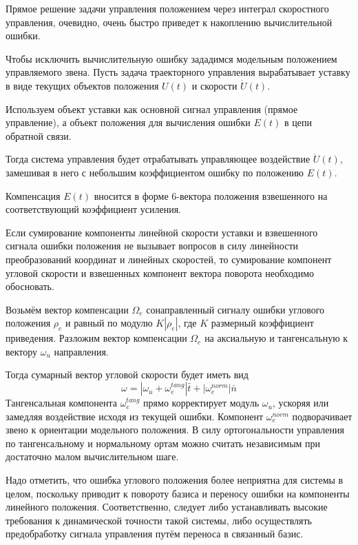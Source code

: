 Прямое решение задачи управления положением через интеграл скоростного управления, очевидно, очень быстро приведет к накоплению вычислительной ошибки.

Чтобы исключить вычислительную ошибку зададимся модельным положением управляемого звена. Пусть задача траекторного управления вырабатывает уставку в виде текущих объектов положения $U(t)$ и скорости $\dot{U}(t)$.

Используем объект уставки как основной сигнал управления (прямое управление), а объект положения для вычисления ошибки $E(t)$ в цепи обратной связи.

Тогда система управления будет отрабатывать управляющее воздействие $\dot{U}(t)$, замешивая в него с небольшим коэффициентом ошибку по положению $E(t)$.

Компенсация $E(t)$ вносится в форме 6-вектора положения взвешенного на соответствующий коэффициент усиления.

Если сумирование компоненты линейной скорости уставки и взвешенного сигнала ошибки положения не вызывает вопросов в силу линейности преобразований координат и линейных скоростей, то сумирование компонент угловой скорости и взвешенных компонент вектора поворота необходимо обосновать.

Возьмём вектор компенсации $\Omega_e$ сонаправленный сигналу ошибки углового положения $\rho_e$ и равный по модулю $K|\rho_e|$, где $K$ размерный коэффициент приведения.
Разложим вектор компенсации $\Omega_e$ на аксиальную и тангенсальную к вектору $\omega_u$ направления.   

Тогда сумарный вектор угловой скорости будет иметь вид 
\begin{equation}
\omega = |\omega_u + \omega_e^{tang}|\bar{t} + |\omega_e^{norm}|\bar{n}
\end{equation} 
Тангенсальная компонента $\omega_e^{tang}$ прямо корректирует модуль $\omega_u$, ускоряя или замедляя воздействие исходя из текущей ошибки. Компонент $\omega_e^{norm}$ подворачивает звено к ориентации модельного положения. В силу ортогональности управления по тангенсальному и нормальному ортам можно считать независимым при достаточно малом вычислительном шаге.

Надо отметить, что ошибка углового положения более неприятна для системы в целом, поскольку приводит к повороту базиса и переносу ошибки на компоненты линейного положения. Соответственно, следует либо устанавливать высокие требования к динамической точности такой системы, либо осуществлять предобработку сигнала управления путём переноса в связанный базис. 

